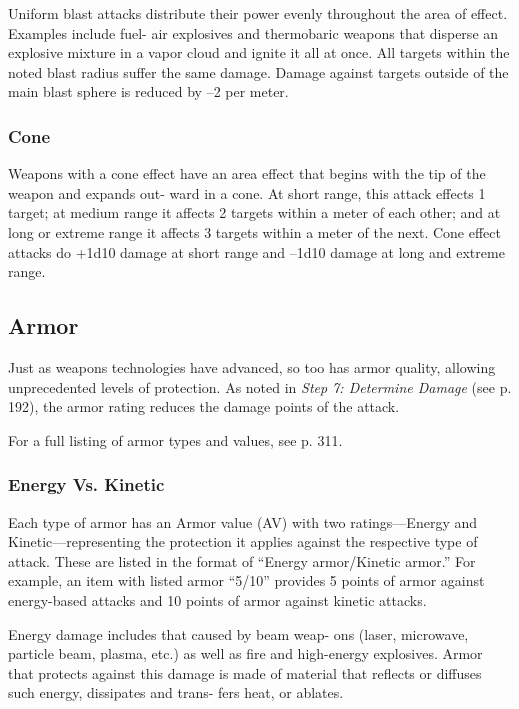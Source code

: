 Uniform blast attacks distribute their power evenly 
throughout the area of effect. Examples include fuel-
air explosives and thermobaric weapons that disperse 
an explosive mixture in a vapor cloud and ignite it all 
at once. All targets within the noted blast radius suffer 
the same damage. Damage against targets outside of 
the main blast sphere is reduced by –2 per meter.

\subsubsection{Cone}

Weapons with a cone effect have an area effect that 
begins with the tip of the weapon and expands out-
ward in a cone. At short range, this attack effects 1 
target; at medium range it affects 2 targets within a 
meter of each other; and at long or extreme range 
it affects 3 targets within a meter of the next. Cone 
effect attacks do +1d10 damage at short range and 
–1d10 damage at long and extreme range.

\subsection{Armor}

Just as weapons technologies have advanced, so too 
has armor quality, allowing unprecedented levels of 
protection. As noted in \textit{Step 7: Determine Damage}
(see p. 192), the armor rating reduces the damage 
points of the attack.

For a full listing of armor types and values, see p. 311.

\subsubsection{Energy Vs. Kinetic}

Each type of armor has an Armor value (AV) with 
two ratings—Energy and Kinetic—representing 
the protection it applies against the respective type 
of attack. These are listed in the format of ``Energy 
armor/Kinetic armor.'' For example, an item with 
listed armor ``5/10'' provides 5 points of armor against 
energy-based attacks and 10 points of armor against 
kinetic attacks.

Energy damage includes that caused by beam weap-
ons (laser, microwave, particle beam, plasma, etc.) as 
well as fire and high-energy explosives. Armor that 
protects against this damage is made of material that 
reflects or diffuses such energy, dissipates and trans-
fers heat, or ablates.

